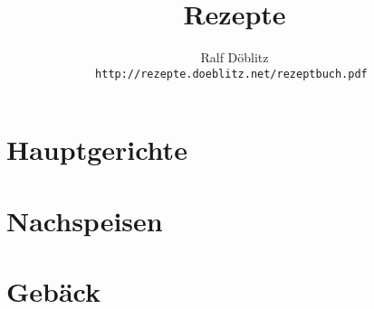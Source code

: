 \documentclass[12pt,a4paper]{book}
\begin{document}
\title{\bfseries\Huge Rezepte}
\author{
  Ralf Döblitz\\[1cm]
  \tt{http://rezepte.doeblitz.net/rezeptbuch.pdf}
}
\maketitle
\tableofcontents

\chapter{Hauptgerichte}


\chapter{Nachspeisen}


\chapter{Gebäck}






\appendix

\printindex[recipe]

\printindex[ingredient]
\end{document}
